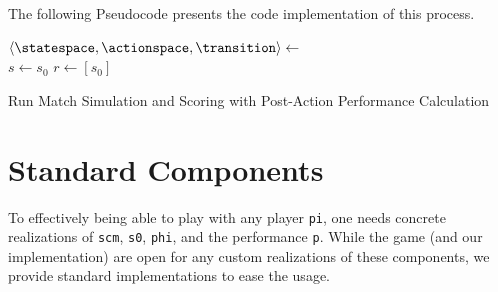 \documentclass{article}
\begin{document}
    The following Pseudocode presents the code implementation of this process.

        \begin{algorithm}
            \SetAlgoLined
            

            $\langle \statespace, \actionspace, \transition \rangle \gets$  \\
            $s \gets s_0$  
            $r \gets [s_0]$ 
            
            
             
            
            \caption{Run Match Simulation and Scoring with Post-Action Performance Calculation}
        \end{algorithm}







\section{Standard Components}
    To effectively being able to play \game with any player \texttt{pi}, one needs concrete realizations of \texttt{scm}, \texttt{s0}, \texttt{phi}, and the performance \texttt{p}.
    While the game (and our implementation) are open for any custom realizations of these components, we provide standard implementations to ease the usage.
\end{document}
